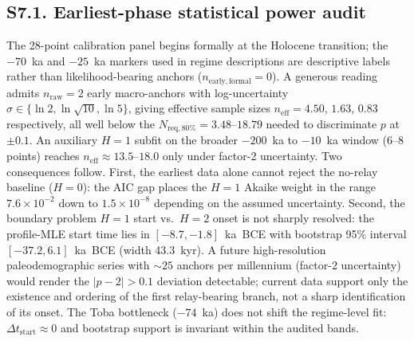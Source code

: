 \documentclass[11pt]{article}
\begin{document}
\subsection*{S7.1. Earliest-phase statistical power audit}
\label{subsec:S7_1_early_power}
The 28-point calibration panel begins formally at the Holocene transition; the $-70$~ka and $-25$~ka markers used in regime descriptions are descriptive labels rather than likelihood-bearing anchors ($n_{\mathrm{early,formal}}{=}0$).  A generous reading admits $n_{\mathrm{raw}}{=}2$ early macro-anchors with log-uncertainty $\sigma{\in}\{\ln 2,\ln\sqrt{10},\ln 5\}$, giving effective sample sizes $n_{\mathrm{eff}}{=}4.50$, $1.63$, $0.83$ respectively, all well below the $N_{\mathrm{req,80\%}}{=}3.48$--$18.79$ needed to discriminate $p$ at $\pm 0.1$.  An auxiliary $H{=}1$ subfit on the broader $-200$~ka to $-10$~ka window (6--8 points) reaches $n_{\mathrm{eff}}{\approx}13.5$--$18.0$ only under factor-2 uncertainty.  Two consequences follow.  First, the earliest data alone cannot reject the no-relay baseline ($H{=}0$): the AIC gap places the $H{=}1$ Akaike weight in the range $7.6{\times}10^{-2}$ down to $1.5{\times}10^{-8}$ depending on the assumed uncertainty.  Second, the boundary problem $H{=}1$ start vs.\ $H{=}2$ onset is not sharply resolved: the profile-MLE start time lies in $[-8.7,-1.8]$~ka~BCE with bootstrap 95\% interval $[-37.2,6.1]$~ka~BCE (width 43.3~kyr).  A future high-resolution paleodemographic series with $\sim\!25$ anchors per millennium (factor-2 uncertainty) would render the $|p{-}2|{>}0.1$ deviation detectable; current data support only the existence and ordering of the first relay-bearing branch, not a sharp identification of its onset.  The Toba bottleneck ($-74$~ka) does not shift the regime-level fit: $\Delta t_{\mathrm{start}}{\approx}0$ and bootstrap support is invariant within the audited bands.

\end{document}

